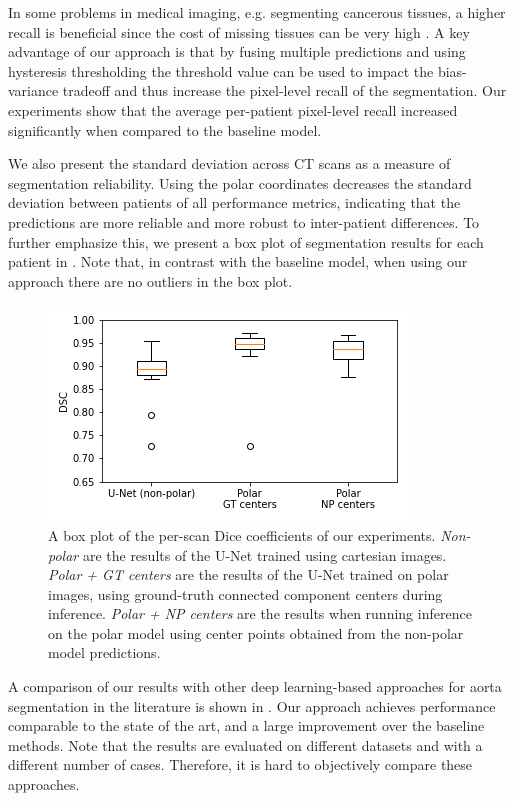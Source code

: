 In some problems in medical imaging, e.g. segmenting cancerous tissues, a higher recall is beneficial since the cost of missing tissues can be very high \cite{tahaMetricsEvaluating3D2015}. A key advantage of our approach is that by fusing multiple predictions and using hysteresis thresholding the threshold value can be used to impact the bias-variance tradeoff and thus increase the pixel-level recall of the segmentation. Our experiments show that the average per-patient pixel-level recall increased significantly when compared to the baseline model.

We also present the standard deviation across CT scans as a measure of segmentation reliability. Using the polar coordinates decreases the standard deviation between patients of all performance metrics, indicating that the predictions are more reliable and more robust to inter-patient differences. To further emphasize this, we present a box plot of segmentation results for each patient in . Note that, in contrast with the baseline model, when using our approach there are no outliers in the box plot.

\begin{figure}[h]
\centering
\includegraphics[width=0.5\columnwidth]{images/4/box_plot}
\caption{A box plot of the per-scan Dice coefficients of our experiments. \textit{Non-polar} are the results of the U-Net trained using cartesian images. \textit{Polar + GT centers} are the results of the U-Net trained on polar images, using ground-truth connected component centers during inference. \textit{Polar + NP centers} are the results when running inference on the polar model using center points obtained from the non-polar model predictions.}
\label{fig:box}
\end{figure}

A comparison of our results with other deep learning-based approaches for aorta segmentation in the literature is shown in . Our approach achieves performance comparable to the state of the art, and a large improvement over the baseline methods. Note that the results are evaluated on different datasets and with a different number of cases. Therefore, it is hard to objectively compare these approaches.

